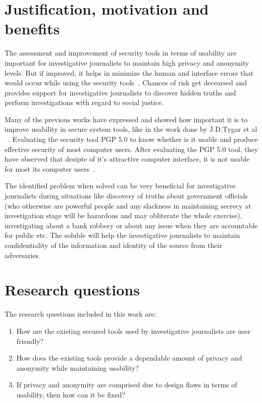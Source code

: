 \section{Justification, motivation and benefits}
The assessment and improvement of security tools in terms of usability are  important for investigative journalists to maintain high privacy and anonymity levels. But if improved, it  helps in minimize the human and interface errors that would occur while using the security tools~\cite{furnell2006challenges}. Chances of risk get decearsed and provides support for investigative journalists to discover hidden truths and perform investigations with regard to social justice.

Many of the previous works have expressed and showed how important it is to improve usability in secure system tools, like in the work done by J.D.Tygar et al ~\cite{whitten1999johnny}. Evaluating the security tool PGP 5.0 to know whether is it usable and produce effective security of most computer users. After evaluating the PGP 5.0 tool, they have observed that   desipte of it's attractive computer interface, it is not usable for most its computer users~\cite{whitten1999johnny}.

The identified problem when solved can be very beneficial for investigative journalists during situations like discovery of truths about government officials (who otherwise are powerful people and any slackness in maintaining secrecy at investigation stage will be hazardous and  may obliterate the whole exercise), investigating about a bank robbery or about any issue when they are accountable for public etc. The soluble will help the investigative journalists to maintain confidentiality of the information and identity of the source from their adversaries.


\section{Research questions}\label{research:questions}
The research questions included in this work are:
\begin{enumerate}
	
	\item How are the existing secured tools used by investigative journalists are user friendly?
	\item How does the existing tools provide a dependable amount of privacy and anonymity while maintaining usability?
	\item If privacy and anonymity are comprised due to design flaws in terms of usability, then how can it be fixed?
	
	
\end{enumerate}


